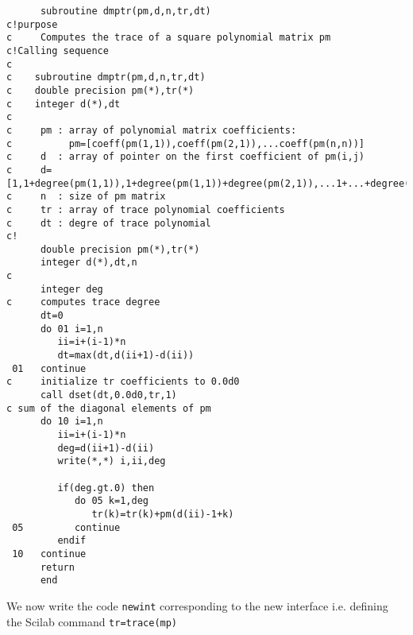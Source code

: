 \begin{verbatim}
      subroutine dmptr(pm,d,n,tr,dt)
c!purpose
c     Computes the trace of a square polynomial matrix pm
c!Calling sequence
c
c    subroutine dmptr(pm,d,n,tr,dt)
c    double precision pm(*),tr(*)
c    integer d(*),dt
c
c     pm : array of polynomial matrix coefficients:
c          pm=[coeff(pm(1,1)),coeff(pm(2,1)),...coeff(pm(n,n))]
c     d  : array of pointer on the first coefficient of pm(i,j)
c     d=[1,1+degree(pm(1,1)),1+degree(pm(1,1))+degree(pm(2,1)),...1+...+degree(pm(n,n))]
c     n  : size of pm matrix
c     tr : array of trace polynomial coefficients
c     dt : degre of trace polynomial
c!
      double precision pm(*),tr(*)
      integer d(*),dt,n
c
      integer deg
c     computes trace degree
      dt=0
      do 01 i=1,n
         ii=i+(i-1)*n
         dt=max(dt,d(ii+1)-d(ii))
 01   continue
c     initialize tr coefficients to 0.0d0
      call dset(dt,0.0d0,tr,1)
c sum of the diagonal elements of pm
      do 10 i=1,n
         ii=i+(i-1)*n
         deg=d(ii+1)-d(ii)
         write(*,*) i,ii,deg

         if(deg.gt.0) then
            do 05 k=1,deg
               tr(k)=tr(k)+pm(d(ii)-1+k)
 05         continue
         endif
 10   continue
      return
      end
\end{verbatim}

We now write the code {\tt newint} corresponding to the new interface
i.e. defining the Scilab command {\tt tr=trace(mp)}

